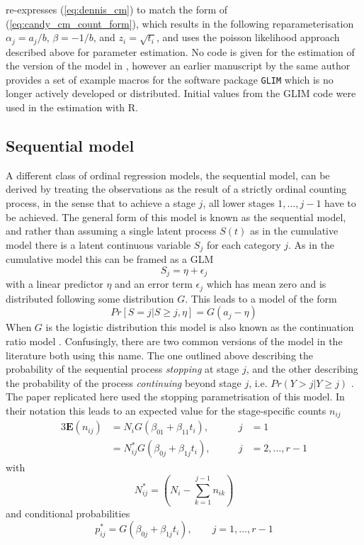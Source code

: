 \citet{candy1991modeling} re-expresses (\ref{eq:dennis_cm}) to match the form of (\ref{eq:candy_cm_count_form}), which results in the following re\-para\-meter\-isation $\alpha_j = a_j/b$, $\beta = -1/b$, and $z_i = \sqrt{t_i}$, and uses the poisson likelihood approach described above for parameter estimation. 
No code is given for the estimation of the version of the model in \citep{candy1991modeling}, however an earlier manuscript by the same author \citep{candy1990biology} provides a set of example macros for the software package \verb+GLIM+ \citep{aitkin1989statistical} which is no longer actively developed or distributed. 
Initial values from the GLIM code were used in the estimation with R.

\subsection{Sequential model}
A different class of ordinal regression models, the sequential model, can be derived by treating the observations as the result of a strictly ordinal counting process, in the sense that to achieve a stage $j$, all lower stages $1,\dots,j-1$ have to be achieved. 
The general form of this model is known as the sequential model, and rather than assuming a single latent process $S(t)$ as in the cumulative model there is a latent continuous variable $S_j$ for each category $j$. 
As in the cumulative model this can be framed as a GLM 
\begin{equation}
S_j = \eta + \epsilon_j
\end{equation}
with a linear predictor $\eta$ and an error term $\epsilon_j$ which has mean zero and is distributed following some distribution $G$. 
This leads to a model of the form 
\begin{equation}
Pr[S = j|S \geq j, \eta] = G(a_j - \eta)
\end{equation}
When $G$ is the logistic distribution this model is also known as the continuation ratio model \citep{fienberg1980analysis}. 
Confusingly, there are two common versions of the model in the literature both using this name. 
The one outlined above describing the probability of the sequential process \emph{stopping} at stage $j$, and the other describing the probability of the process \emph{continuing} beyond stage $j$, i.e. $Pr(Y > j | Y \geq j)$ \citep{burkner2019ordinal,VGAM}. 
The paper replicated here \citep{candy1991modeling}  used the stopping parametrisation of this model.
In their notation this leads to an expected value for the stage-specific counts $n_{ij}$
\begin{alignat}{3}
\mathbf{E}(n_{ij})&=N_i G(\beta_{01} + \beta_{11}t_i), &j&=1 \label{eq:candy_sm_counts}\\
&=N^*_{ij} G(\beta_{0j} + \beta_{1j}t_i), \qquad &j&=2,\dots,r-1 \nonumber
\end{alignat}
with 
$$N^*_{ij}=\left(N_i - \sum_{k=1}^{j-1}n_{ik}\right) $$
and conditional probabilities 
\begin{equation}
p^*_{ij} =  G(\beta_{0j} + \beta_{1j}t_i), \qquad j=1,\dots,r-1
\end{equation}


